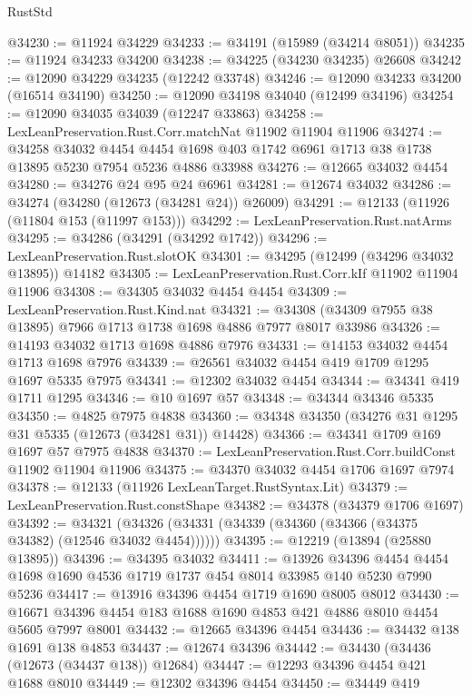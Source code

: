 \begin{lexlean}{RustStd}
\begin{coremodule}
@34230 := @11924 @34229
@34233 := @34191 (@15989 (@34214 @8051))
@34235 := @11924 @34233 @34200
@34238 := @34225 (@34230 @34235) @26608
@34242 := @12090 @34229 @34235 (@12242 @33748)
@34246 := @12090 @34233 @34200 (@16514 @34190)
@34250 := @12090 @34198 @34040 (@12499 @34196)
@34254 := @12090 @34035 @34039 (@12247 @33863)
@34258 := LexLeanPreservation.Rust.Corr.matchNat @11902 @11904 @11906
@34274 := @34258
    @34032
    @4454
    @4454
    @1698
    @403
    @1742
    @6961
    @1713
    @38
    @1738
    @13895
    @5230
    @7954
    @5236
    @4886
    @33988
@34276 := @12665 @34032 @4454
@34280 := @34276 @24 @95 @24 @6961
@34281 := @12674 @34032
@34286 := @34274 (@34280 (@12673 (@34281 @24)) @26009)
@34291 := @12133 (@11926 (@11804 @153 (@11997 @153)))
@34292 := LexLeanPreservation.Rust.natArms
@34295 := @34286 (@34291 (@34292 @1742))
@34296 := LexLeanPreservation.Rust.slotOK
@34301 := @34295 (@12499 (@34296 @34032 @13895)) @14182
@34305 := LexLeanPreservation.Rust.Corr.kIf @11902 @11904 @11906
@34308 := @34305 @34032 @4454 @4454
@34309 := LexLeanPreservation.Rust.Kind.nat
@34321 := @34308 (@34309 @7955 @38 @13895) @7966 @1713 @1738 @1698 @4886 @7977 @8017 @33986
@34326 := @14193 @34032 @1713 @1698 @4886 @7976
@34331 := @14153 @34032 @4454 @1713 @1698 @7976
@34339 := @26561 @34032 @4454 @419 @1709 @1295 @1697 @5335 @7975
@34341 := @12302 @34032 @4454
@34344 := @34341 @419 @1711 @1295
@34346 := @10 @1697 @57
@34348 := @34344 @34346 @5335
@34350 := @4825 @7975 @4838
@34360 := @34348 @34350 (@34276 @31 @1295 @31 @5335 (@12673 (@34281 @31)) @14428)
@34366 := @34341 @1709 @169 @1697 @57 @7975 @4838
@34370 := LexLeanPreservation.Rust.Corr.buildConst @11902 @11904 @11906
@34375 := @34370 @34032 @4454 @1706 @1697 @7974
@34378 := @12133 (@11926 LexLeanTarget.RustSyntax.Lit)
@34379 := LexLeanPreservation.Rust.constShape
@34382 := @34378 (@34379 @1706 @1697)
@34392 := @34321 (@34326 (@34331 (@34339 (@34360 (@34366 (@34375 @34382) (@12546 @34032 @4454))))))
@34395 := @12219 (@13894 (@25880 @13895))
@34396 := @34395 @34032
@34411 := @13926
    @34396
    @4454
    @4454
    @1698
    @1690
    @4536
    @1719
    @1737
    @454
    @8014
    @33985
    @140
    @5230
    @7990
    @5236
@34417 := @13916 @34396 @4454 @1719 @1690 @8005 @8012
@34430 := @16671 @34396 @4454 @183 @1688 @1690 @4853 @421 @4886 @8010 @4454 @5605 @7997 @8001
@34432 := @12665 @34396 @4454
@34436 := @34432 @138 @1691 @138 @4853
@34437 := @12674 @34396
@34442 := @34430 (@34436 (@12673 (@34437 @138)) @12684)
@34447 := @12293 @34396 @4454 @421 @1688 @8010
@34449 := @12302 @34396 @4454
@34450 := @34449 @419

\end{coremodule}
\end{lexlean}
